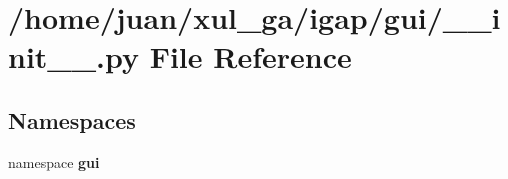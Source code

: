 \section{/home/juan/xul\_\-ga/igap/gui/\_\-\_\-init\_\-\_\-.py File Reference}
\label{gui_2____init_____8py}
\subsection*{Namespaces}
\begin{CompactItemize}
\item 
namespace {\bf gui}
\end{CompactItemize}
